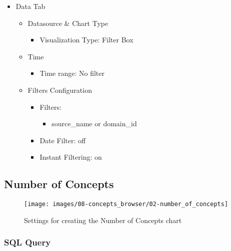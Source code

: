 \documentclass[
]{book}
\providecommand{\tightlist}{%
  \setlength{\itemsep}{0pt}\setlength{\parskip}{0pt}}
\begin{document}
\begin{itemize}
\tightlist
\item
  Data Tab

  \begin{itemize}
  \tightlist
  \item
    Datasource \& Chart Type

    \begin{itemize}
    \tightlist
    \item
      Visualization Type: Filter Box
    \end{itemize}
  \item
    Time

    \begin{itemize}
    \tightlist
    \item
      Time range: No filter
    \end{itemize}
  \item
    Filters Configuration

    \begin{itemize}
    \tightlist
    \item
      Filters:

      \begin{itemize}
      \tightlist
      \item
        source\_name or domain\_id
      \end{itemize}
    \item
      Date Filter: off
    \item
      Instant Filtering: on
    \end{itemize}
  \end{itemize}
\end{itemize}

\hypertarget{number-of-concepts}{%
\subsection*{Number of Concepts}\label{number-of-concepts}}

\begin{figure}
\texttt{[image: images/08-concepts\_browser/02-number\_of\_concepts]} \caption{Settings for creating the Number of Concepts chart}\label{fig:numOfConcepts}
\end{figure}

\hypertarget{sql-query-30}{%
\subsubsection*{SQL Query}\label{sql-query-30}}
\end{document}
